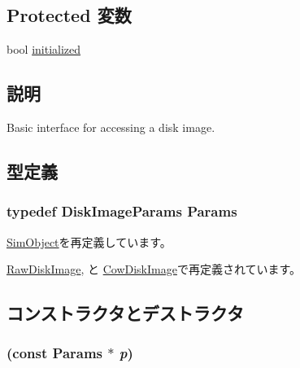 \subsection*{Protected 変数}
\begin{DoxyCompactItemize}
\item 
bool \hyperlink{classDiskImage_aedeffc7d23da25d52b9a50045189fe2b}{initialized}
\end{DoxyCompactItemize}


\subsection{説明}
Basic interface for accessing a disk image. 

\subsection{型定義}
\hypertarget{classDiskImage_a7fcdce57df9801d7eebcb65f9ad2e0c0}{
\subsubsection[{Params}]{\setlength{\rightskip}{0pt plus 5cm}typedef DiskImageParams {\bf Params}}}
\label{classDiskImage_a7fcdce57df9801d7eebcb65f9ad2e0c0}


\hyperlink{classSimObject_a0f0761d2db586a23bb2a2880b8f387bb}{SimObject}を再定義しています。

\hyperlink{classRawDiskImage_af714565806621f1401c71701d4c88e71}{RawDiskImage}, と \hyperlink{classCowDiskImage_a564df726143da4914743e9d8c1a17c6c}{CowDiskImage}で再定義されています。

\subsection{コンストラクタとデストラクタ}
\hypertarget{classDiskImage_a179891f520c932a7cf5c88dfc25c0b3b}{
\subsubsection[{DiskImage}]{ (const {\bf Params} $\ast$ {\em p})}}
\label{classDiskImage_a179891f520c932a7cf5c88dfc25c0b3b}



